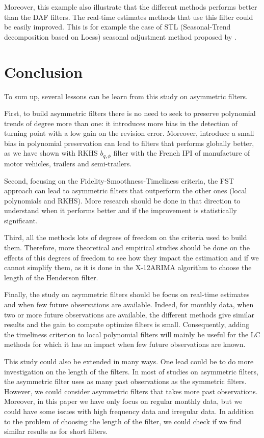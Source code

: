 \documentclass[
  12pt,
  ,
  a4paper]{article}
\newcommand\1{\mathds{1}}
\begin{document}
Moreover, this example also illustrate that the different methods performs better than the DAF filters.
The real-time estimates methods that use this filter could be easily improved.
This is for example the case of STL (Seasonal-Trend decomposition based on Loess) seasonal adjustment method proposed by \textcite{cleveland90}.

\newpage

\hypertarget{conclusion}{%
\section{Conclusion}\label{conclusion}}

To sum up, several lessons can be learn from this study on asymmetric filters.

First, to build asymmetric filters there is no need to seek to preserve polynomial trends of degree more than one: it introduces more bias in the detection of turning point with a low gain on the revision error.
Moreover, introduce a small bias in polynomial preservation can lead to filters that performs globally better, as we have shown with RKHS \(b_{q,\phi}\) filter with the French IPI of manufacture of motor vehicles, trailers and semi-trailers.

Second, focusing on the Fidelity-Smoothness-Timeliness criteria, the FST approach can lead to asymmetric filters that outperform the other ones (local polynomials and RKHS).
More research should be done in that direction to understand when it performs better and if the improvement is statistically significant.

Third, all the methods lots of degrees of freedom on the criteria used to build them.
Therefore, more theoretical and empirical studies should be done on the effects of this degrees of freedom to see how they impact the estimation and if we cannot simplify them, as it is done in the X-12ARIMA algorithm to choose the length of the Henderson filter.

Finally, the study on asymmetric filters should be focus on real-time estimates and when few future observations are available.
Indeed, for monthly data, when two or more future observations are available, the different methods give similar results and the gain to compute optimize filters is small.
Consequently, adding the timeliness criterion to local polynomial filters will mainly be useful for the LC methods for which it has an impact when few future observations are known.

This study could also be extended in many ways.
One lead could be to do more investigation on the length of the filters.
In most of studies on asymmetric filters, the asymmetric filter uses as many past observations as the symmetric filters. However, we could consider asymmetric filters that takes more past observations. Moreover, in this paper we have only focus on regular monthly data, but we could have some issues with high frequency data and irregular data.
In addition to the problem of choosing the length of the filter, we could check if we find similar results as for short filters.
\end{document}
